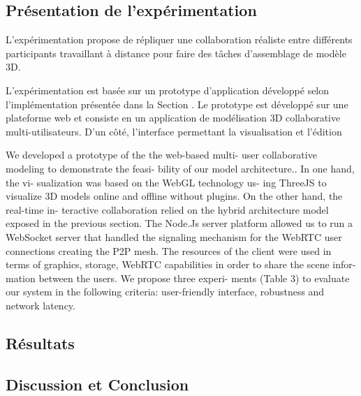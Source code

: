 
\subsection{Présentation de l'expérimentation}

 L'expérimentation propose de répliquer une collaboration réaliste entre 
différents participants travaillant à distance pour faire des tâches d'assemblage de 
modèle 3D.

L'expérimentation est basée sur un prototype d'application développé selon 
l'implémentation présentée dans la Section .
Le prototype est développé sur une plateforme web et consiste en un application 
de modélisation 3D collaborative multi-utilisateurs. 
D'un côté, l'interface permettant la visualisation et l'édition 

We developed a prototype of the the web-based multi- user collaborative modeling 
to demonstrate the feasi- bility of our model architecture.. In one hand, the vi- 
sualization was based on the WebGL technology us- ing ThreeJS to visualize 3D 
models online and offline without plugins. On the other hand, the real-time in- 
teractive collaboration relied on the hybrid architecture model exposed in the 
previous section. The Node.Js server platform allowed us to run a WebSocket 
server that handled the signaling mechanism for the WebRTC user connections 
creating the P2P mesh. The resources of the client were used in terms of 
graphics, storage, WebRTC capabilities in order to share the scene infor- mation 
between the users. We propose three experi- ments (Table 3) to evaluate our 
system in the following criteria: user-friendly interface, robustness and network 
latency.




\subsection{Résultats}
\subsection{Discussion et Conclusion}